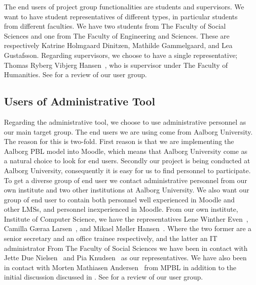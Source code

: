 The end users of project group functionalities are students and supervisors.
We want to have student representatives of different types, in particular students from different faculties.
We have two students from The Faculty of Social Sciences and one from The Faculty of Engineering and Sciences.
These are respectively Katrine Holmgaard Dinitzen, Mathilde Gammelgaard, and Lea Gustafsson.
Regarding supervisors, we choose to have a single representative; Thomas Ryberg Vibjerg Hansen~\cite{thomas}, who is supervisor under The Faculty of Humanities.
See  for a review of our user group.

\subsection{Users of Administrative Tool}
\label{sub:enduserstool}
Regarding the administrative tool, we choose to use administrative personnel as our main target group.
The end users we are using come from Aalborg University.
The reason for this is two-fold.
First reason is that we are implementing the Aalborg PBL model into Moodle, which means that Aalborg University come as a natural choice to look for end users.
Secondly our project is being conducted at Aalborg University, consequently it is easy for us to find personnel to participate.
To get a diverse group of end user we contact administrative personnel from our own institute and two other institutions at Aalborg University.
We also want our group of end user to contain both personnel well experienced in Moodle and other LMSs, and personnel inexperienced in Moodle.
From our own institute, Institute of Computer Science, we have the representatives Lene Winther Even~\cite{lene}, Camilla G\ae{}raa Larsen~\cite{camilla}, and Mikael M\o{}ller Hansen~\cite{mikael}.
Where the two former are a senior secretary and an office trainee respectively, and the latter an IT administrator
From The Faculty of Social Sciences we have been in contact with  Jette Due Nielsen~\cite{jette} and Pia Knudsen~\cite{piak} as our representatives.
We have also been in contact with Morten Mathiasen Andersen~\cite{morten} from MPBL in addition to the initial discussion discussed in .
See  for a review of our user group.